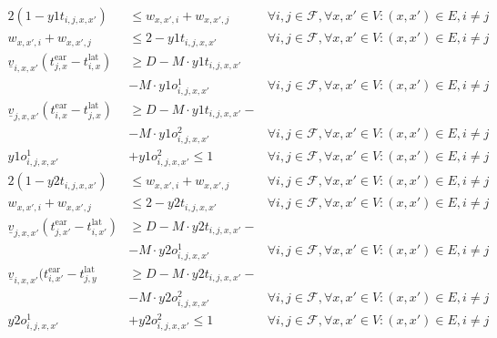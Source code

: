 \documentclass[../thesis.tex]{subfiles}
\begin{document}
\begin{align}
%
    2(1-y1t_{i,j,x,x'})& \leq w_{x,x',i}+ w_{x,x',j} & \forall i,j\in\mathcal F,\forall x,x'\in V: (x,x')\in E, i\neq j\\
    w_{x,x',i} + w_{x,x',j}&\leq 2- y1t_{i,j,x,x'}& \forall i,j\in\mathcal F,\forall x,x'\in V: (x,x')\in E, i\neq j\\
    \nonumber
    \underline v_{i,x,x'}(t^\text{ear}_{j,x}-t^\text{lat}_{i,x})&\geq D - M\cdot y1t_{i,j,x,x'}
    \\&
    - M\cdot y1o^1_{i,j,x,x'} & \forall i,j\in\mathcal F,\forall x,x'\in V: (x,x')\in E, i\neq j\\   
    \nonumber
    \underline v_{j,x,x'}(t^\text{ear}_{i,x}-t^\text{lat}_{j,x})&\geq D - M\cdot y1t_{i,j,x,x'}-
    \\&
    - M\cdot y1o^2_{i,j,x,x'}&\forall i,j\in\mathcal F,\forall x,x'\in V: (x,x')\in E, i\neq j\\
    y1o^1_{i,j,x,x'} &+ y1o^2_{i,j,x,x'}\leq 1& \forall i,j\in\mathcal F,\forall x,x'\in V: (x,x')\in E, i\neq j\\
    2(1-y2t_{i,j,x,x'})& \leq w_{x,x',i} + w_{x,x',j} & \forall i,j\in\mathcal F,\forall x,x'\in V: (x,x')\in E, i\neq j\\
    w_{x,x',i} + w_{x,x',j} &\leq 2- y2t_{i,j,x,x'}& \forall i,j\in\mathcal F,\forall x,x'\in V: (x,x')\in E, i\neq j\\
    \nonumber
    \underline v_{j,x,x'}(t^\text{ear}_{j,x'}-t^\text{lat}_{i,x'})&\geq D - M\cdot y2t_{i,j,x,x'}-
    \\&
    - M\cdot y2o^1_{i,j,x,x'} & \forall i,j\in\mathcal F,\forall x,x'\in V: (x,x')\in E, i\neq j\\    
    \nonumber
    \underline v_{i,x,x'}(t^\text{ear}_{i,x'}-t^\text{lat}_{j,y}&\geq D - M\cdot y2t_{i,j,x,x'}-
    \\&
    - M\cdot y2o^2_{i,j,x,x'}&\forall i,j\in\mathcal F,\forall x,x'\in V: (x,x')\in E, i\neq j\\
    y2o^1_{i,j,x,x'} &+ y2o^2_{i,j,x,x'}\leq 1& \forall i,j\in\mathcal F,\forall x,x'\in V: (x,x')\in E, i\neq j
\end{align}
\end{document}
